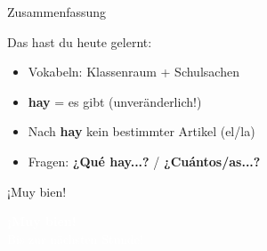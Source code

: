 \documentclass[aspectratio=169, 11pt]{beamer}
\newcommand{\es}[1]{\textbf{\textcolor{spanischrot}{#1}}}
\begin{document}
\begin{frame}{Zusammenfassung}

\begin{block}{Das hast du heute gelernt:}
\begin{itemize}
    \item Vokabeln: Klassenraum + Schulsachen
    \item \es{hay} = es gibt (unveränderlich!)
    \item Nach \es{hay} kein bestimmter Artikel (el/la)
    \item Fragen: \es{¿Qué hay...?} / \es{¿Cuántos/as...?}
\end{itemize}
\end{block}

\vspace{0.8cm}

\begin{center}
{\Large\textcolor{spanischrot}{¡Muy bien!}}
\end{center}

\end{frame}

\begin{frame}
\begin{center}
\vspace{2cm}
{\Huge\bfseries\textcolor{white}{¡Muy bien!}}\\[1cm]
{\Large\textcolor{white}{Bis zur nächsten Stunde!}}
\end{center}
\end{frame}
\end{document}
